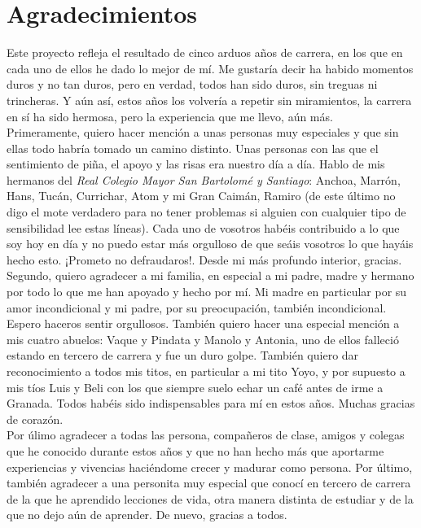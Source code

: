 

\chapter{Agradecimientos}

    Este proyecto refleja el resultado de cinco arduos años de carrera, en los que en cada uno de ellos he dado lo mejor de mí. Me gustaría decir ha habido momentos duros y no tan duros, pero en verdad, todos han sido duros, sin treguas ni trincheras. Y aún así, estos años los volvería a repetir sin miramientos, la carrera en sí ha sido hermosa, pero la experiencia que me llevo, aún más. \\
    
    Primeramente, quiero hacer mención a unas personas muy especiales y que sin ellas todo habría tomado un camino distinto. Unas personas con las que el sentimiento de piña, el apoyo y las risas era nuestro día a día. Hablo de mis hermanos del \textit{Real Colegio Mayor San Bartolomé y Santiago}: Anchoa, Marrón, Hans, Tucán, Currichar, Atom y mi Gran Caimán, Ramiro (de este último no digo el mote verdadero para no tener problemas si alguien con cualquier tipo de sensibilidad lee estas líneas). Cada uno de vosotros habéis contribuido a lo que soy hoy en día y no puedo estar más orgulloso de que seáis vosotros lo que hayáis hecho esto. ¡Prometo no defraudaros!. Desde mi más profundo interior, gracias. \\
    
    Segundo, quiero agradecer a mi familia, en especial a mi padre, madre y hermano por todo lo que me han apoyado y hecho por mí. Mi madre en particular por su amor incondicional y mi padre, por su preocupación, también incondicional. Espero haceros sentir orgullosos. También quiero hacer una especial mención a mis cuatro abuelos: Vaque y Pindata y Manolo y Antonia, uno de ellos falleció estando en tercero de carrera y fue un duro golpe. También quiero dar reconocimiento a todos mis titos, en particular a mi tito Yoyo, y por supuesto a mis tíos Luis y Beli con los que siempre suelo echar un café antes de irme a Granada. Todos habéis sido indispensables para mí en estos años. Muchas gracias de corazón. \\
    
    Por úlimo agradecer a todas las persona, compañeros de clase, amigos y colegas que he conocido durante estos años y que no han hecho más que aportarme experiencias y vivencias haciéndome crecer y madurar como persona. Por último, también agradecer a una personita muy especial que conocí en tercero de carrera de la que he aprendido lecciones de vida, otra manera distinta de estudiar y de la que no dejo aún de aprender. De nuevo, gracias a todos. \\

\cleardoublepage
\endinput
